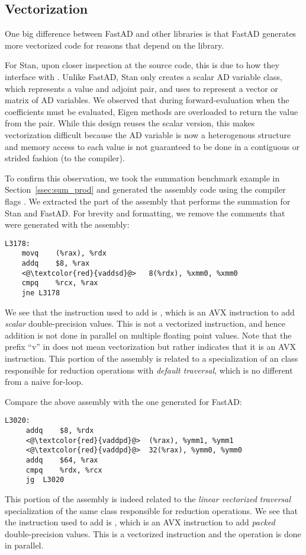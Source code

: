 \subsection{Vectorization}

One big difference between FastAD and other libraries is that 
FastAD generates more vectorized code for reasons that depend on the library.

For Stan, upon closer inspection at the source code, 
this is due to how they interface with .
Unlike FastAD, Stan only creates a scalar AD variable class,
which represents a value and adjoint pair,
and uses 
to represent a vector or matrix of AD variables.
We observed that during forward-evaluation when the coefficients must be evaluated,
Eigen methods are overloaded to return the value from the pair.
While this design reuses the scalar version,
this makes vectorization difficult because the AD variable
is now a heterogenous structure and memory access to each value
is not guaranteed to be done in a contiguous or strided fashion
(to the compiler).

To confirm this observation, we took the
summation benchmark example in Section~\ref{ssec:sum_prod}
and generated the assembly code using the compiler flags .
We extracted the part of the assembly that performs the summation for Stan and FastAD.\@
For brevity and formatting, we remove the comments that were generated with the assembly:
\begin{lstlisting}[style=customasm]
L3178:
    movq    (%rax), %rdx
    addq    $8, %rax
    <@\textcolor{red}{vaddsd}@>   8(%rdx), %xmm0, %xmm0 
    cmpq    %rcx, %rax 
    jne L3178
\end{lstlisting}
We see that the instruction used to add is ,
which is an AVX instruction to add \emph{scalar} double-precision values.
This is not a vectorized instruction, and hence addition is not done in parallel
on multiple floating point values.
Note that the prefix ``v'' in  does not mean vectorization but 
rather indicates that it is an AVX instruction.
This portion of the assembly is related to a specialization of an  class 
responsible for reduction operations with \emph{default traversal},
which is no different from a naive for-loop.

Compare the above assembly with the one generated for FastAD:
\begin{lstlisting}[style=customasm]
 L3020:
     addq    $8, %rdx
     <@\textcolor{red}{vaddpd}@>  (%rax), %ymm1, %ymm1   
     <@\textcolor{red}{vaddpd}@>  32(%rax), %ymm0, %ymm0 
     addq    $64, %rax
     cmpq    %rdx, %rcx 
     jg  L3020 
\end{lstlisting}
This portion of the assembly is indeed related to the \emph{linear vectorized traversal}
specialization of the same  class responsible for reduction operations.
We see that the instruction used to add is ,
which is an AVX instruction to add \emph{packed} double-precision values.
This is a vectorized instruction and the operation is done in parallel.

